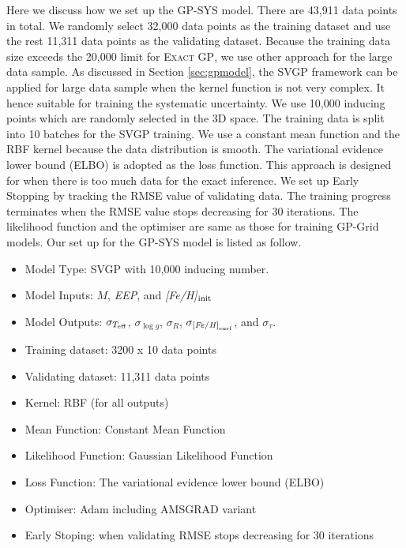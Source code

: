 Here we discuss how we set up the GP-SYS model. 
There are 43,911 data points in total. We randomly select 32,000 data points as the training dataset and use the rest 11,311 data points as the validating dataset. Because the training data size exceeds the 20,000 limit for \textsc{Exact GP}, we use other approach for the large data sample.
%
As discussed in Section \ref{sec:gpmodel}, the SVGP framework can be applied for large data sample when the kernel function is not very complex. It hence suitable for training the systematic uncertainty. We use 10,000 inducing points which are randomly selected in the 3D space. The training data is split into 10 batches for the SVGP training. 
%
We use a constant mean function and the RBF kernel because the data distribution is smooth. The variational evidence lower bound (ELBO) is adopted as the loss function. This approach is designed for when there is too much data for the exact inference. We set up Early Stopping by tracking the RMSE value of validating data. The training progress terminates when the RMSE value stops decreasing for 30 iterations.
The likelihood function and the optimiser are same as those for training GP-Grid models. 
Our set up for the GP-SYS model is listed as follow.
\begin{itemize}
\item Model Type: SVGP with 10,000 inducing number. 
\item Model Inputs: $M$, {\it EEP}, and {\it [Fe/H]}$_{\rm init}$
\item Model Outputs: $\sigma_{T_{\rm eff}}$, $\sigma_{\log g}$, $\sigma_{R}$, $\sigma_{\rm {\it [Fe/H]}_{surf}}$, and $\sigma_{\tau}$.
\item Training dataset: 3200 x 10 data points
\item Validating dataset: 11,311 data points
\item Kernel: RBF (for all outputs)
\item Mean Function: Constant Mean Function 
\item Likelihood Function: Gaussian Likelihood Function
\item Loss Function: The variational evidence lower bound (ELBO) 
\item Optimiser: Adam including AMSGRAD variant
\item Early Stoping: when validating RMSE stops decreasing for 30 iterations
\end{itemize}    


